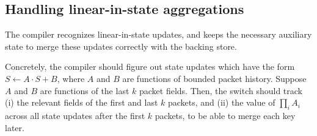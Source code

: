 \subsection{Handling linear-in-state aggregations}
\label{sec:linear-in-state-compilation}

The \TheSystem compiler recognizes linear-in-state updates, and keeps
the necessary auxiliary state to merge these updates correctly with the backing
store. 

Concretely, the compiler should figure out state updates which have the form $S
\gets A \cdot S + B$, where $A$ and $B$ are functions of bounded packet
history. Suppose $A$ and $B$ are functions of the last $k$ packet fields. Then,
the switch should track (i) the relevant fields of the first and last $k$
packets, and (ii) the value of $\prod_{i} A_i$ across all state updates after
the first $k$ packets, to be able to merge each key later. %




